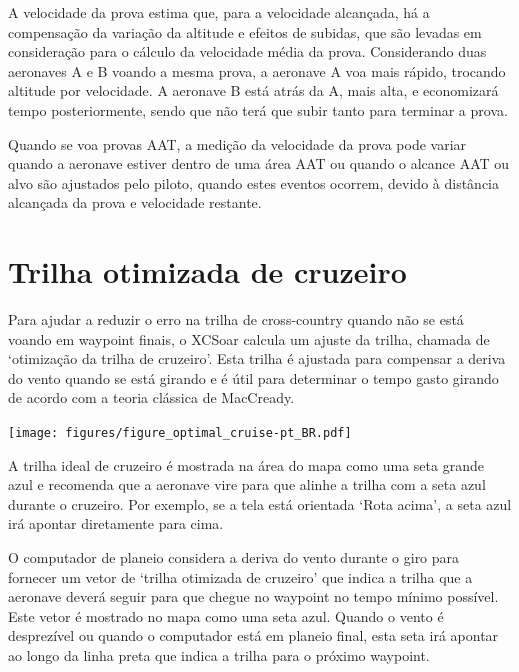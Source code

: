 A velocidade da prova estima que, para a velocidade alcançada, há a compensação da variação da altitude e efeitos de subidas, que são levadas em consideração para o cálculo da velocidade média da prova.  Considerando duas aeronaves A e B voando a mesma prova, a aeronave A voa mais rápido, trocando altitude por velocidade.  A aeronave B está atrás da A, mais alta, e economizará tempo posteriormente, sendo que não terá que subir tanto para terminar a prova.

Quando se voa provas AAT, a medição da velocidade da prova pode variar quando a aeronave estiver dentro de uma área AAT ou quando o alcance AAT ou alvo são ajustados pelo piloto, quando estes eventos ocorrem, devido à distância alcançada da prova e velocidade restante.


\section{Trilha otimizada de cruzeiro}

Para ajudar a reduzir o erro na trilha de cross-country quando não se está voando em waypoint finais, o XCSoar calcula um ajuste da trilha, chamada de ‘otimização da trilha de cruzeiro’.    Esta trilha é ajustada para compensar a deriva do vento quando se está girando e é útil para determinar o tempo gasto girando de acordo com a teoria clássica de MacCready.

\begin{center}
\begin{maxipage}
\centering
\def\svgwidth{0.8\linewidth}
\texttt{[image: figures/figure\_optimal\_cruise-pt\_BR.pdf]}
\end{maxipage}
\end{center}

A trilha ideal de cruzeiro é mostrada na área do mapa como uma seta grande azul e recomenda que a aeronave vire para que alinhe a trilha com a seta azul durante o cruzeiro.  Por exemplo, se a tela está orientada ‘Rota acima’, a seta azul irá apontar diretamente para cima.

O computador de planeio considera a deriva do vento durante o giro para fornecer um vetor de ‘trilha otimizada de cruzeiro’ que indica a trilha que a aeronave deverá seguir para que chegue no waypoint no tempo mínimo possível.  Este vetor é mostrado no mapa como uma seta azul.  Quando o vento é desprezível ou quando o computador está em planeio final, esta seta irá apontar ao longo da linha preta que indica a trilha para o próximo waypoint.

